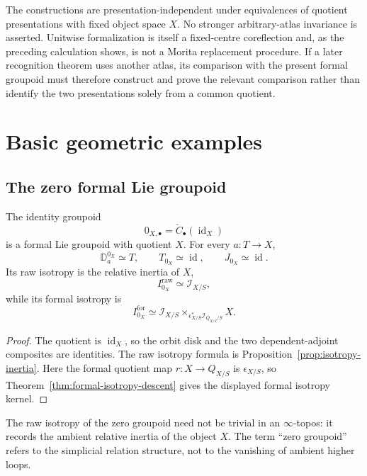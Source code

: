 \begin{remark}
The constructions are presentation-independent under equivalences of quotient
presentations with fixed object space $X$.  No stronger arbitrary-atlas
invariance is asserted.  Unitwise formalization is itself a fixed-centre
coreflection and, as the preceding calculation shows, is not a Morita
replacement procedure.  If a later recognition theorem uses another atlas,
its comparison with the present formal groupoid must therefore construct and
prove the relevant comparison rather than identify the two presentations
solely from a common quotient.
\end{remark}


\section{Basic geometric examples}
\label{sec:flg-examples}

\subsection{The zero formal Lie groupoid}

\begin{example}
The identity groupoid
\[
    0_{X,\bullet}
    =
    \check C_\bullet(\operatorname{id}_X)
\]
is a formal Lie groupoid with quotient $X$.  For every $a:T\to X$,
\[
    \mathbb D^{0_X}_a\simeq T,
    \qquad
    T_{0_X}\simeq\operatorname{id},
    \qquad
    J_{0_X}\simeq\operatorname{id}.
\]
Its raw isotropy is the relative inertia of $X$,
\[
    I^{\mathrm{raw}}_{0_X}
    \simeq
    \mathcal I_{X/S},
\]
while its formal isotropy is
\[
    I^{\mathrm{for}}_{0_X}
    \simeq
    \mathcal I_{X/S}
    \times_{\epsilon_{X/S}^*\mathcal I_{Q_{X/S}/S}}
    X.
\]
\end{example}

\begin{proof}
The quotient is $\operatorname{id}_X$, so the orbit disk and the two
dependent-adjoint composites are identities.  The raw isotropy formula is
Proposition~\ref{prop:isotropy-inertia}.  Here the formal quotient map
$r:X\to Q_{X/S}$ is $\epsilon_{X/S}$, so
Theorem~\ref{thm:formal-isotropy-descent} gives the displayed formal
isotropy kernel.
\end{proof}

\begin{remark}
The raw isotropy of the zero groupoid need not be trivial in an
$\infty$-topos: it records the ambient relative inertia of the object $X$.
The term ``zero groupoid'' refers to the simplicial relation structure, not
to the vanishing of ambient higher loops.
\end{remark}


